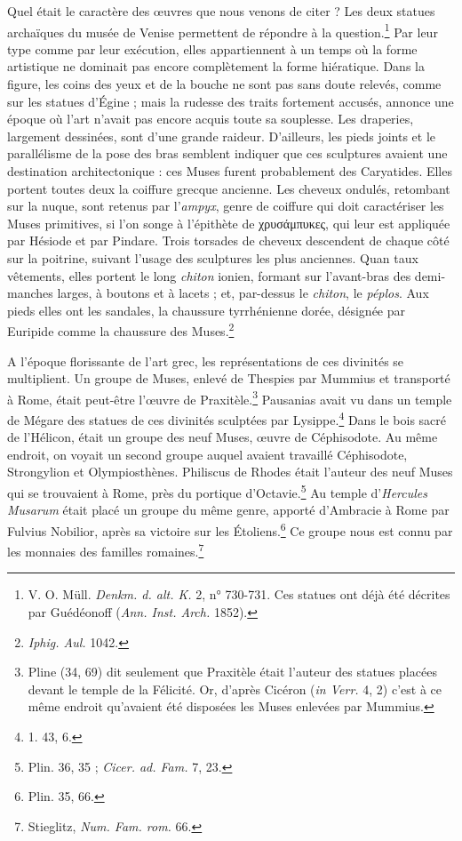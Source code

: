 \documentclass[landscape, a4paper, 11pt, oneside, polutonikogreek, french]{article}
\begin{document}
Quel était le caractère des œuvres que nous venons de citer ? Les deux statues archaïques du musée de Venise permettent de répondre à la question.\footnote{V. O. Müll. \emph{Denkm. d. alt. K.} 2, n° 730-731. Ces statues ont déjà été décrites par Guédéonoff (\emph{Ann. Inst. Arch.} 1852).} Par leur type comme par leur exécution, elles appartiennent à un temps où la forme artistique ne dominait pas encore complètement la forme hiératique. Dans la figure, les coins des yeux et de la bouche ne sont pas sans doute relevés, comme sur les statues d'Égine ; mais la rudesse des traits fortement accusés, annonce une époque où l'art n'avait pas encore acquis toute sa souplesse. Les draperies, largement dessinées, sont d'une grande raideur. D'ailleurs, les pieds joints et le parallélisme de la pose des bras semblent indiquer que ces sculptures avaient une destination architectonique : ces Muses furent probablement des Caryatides. Elles portent toutes deux la coiffure grecque ancienne. Les cheveux ondulés, retombant sur la nuque, sont retenus par l'\emph{ampyx}, genre de coiffure qui doit caractériser les Muses primitives, si l'on songe à l'épithète de χρυσάμπυκες, qui leur est appliquée par Hésiode et par Pindare. Trois torsades de cheveux descendent de chaque côté sur la poitrine, suivant l'usage des sculptures les plus anciennes. Quan taux vêtements, elles portent le long \emph{chiton} ionien, formant sur l'avant-bras des demi-manches larges, à boutons et à lacets ; et, par-dessus le \emph{chiton}, le \emph{péplos}. Aux pieds elles ont les sandales, la chaussure tyrrhénienne dorée, désignée par Euripide comme la chaussure des Muses.\footnote{\emph{Iphig. Aul.} 1042.}

A l'époque florissante de l'art grec, les représentations de ces divinités se multiplient. Un groupe de Muses, enlevé de Thespies par Mummius et transporté à Rome, était peut-être l'œuvre de Praxitèle.\footnote{Pline (34, 69) dit seulement que Praxitèle était l'auteur des statues placées devant le temple de la Félicité. Or, d'après Cicéron (\emph{in Verr.} 4, 2) c'est à ce même endroit qu'avaient été disposées les Muses enlevées par Mummius.} Pausanias avait vu dans un temple de Mégare des statues de ces divinités sculptées par Lysippe.\footnote{1. 43, 6.} Dans le bois sacré de l'Hélicon, était un groupe des neuf Muses, œuvre de Céphisodote. Au même endroit, on voyait un second groupe auquel avaient travaillé Céphisodote, Strongylion et Olympiosthènes. Philiscus de Rhodes était l'auteur des neuf Muses qui se trouvaient à Rome, près du portique d'Octavie.\footnote{Plin. 36, 35 ; \emph{Cicer. ad. Fam.} 7, 23.} Au temple d'\emph{Hercules Musarum} était placé un groupe du même genre, apporté d'Ambracie à Rome par Fulvius Nobilior, après sa victoire sur les Étoliens.\footnote{Plin. 35, 66.} Ce groupe nous est connu par les monnaies des familles romaines.\footnote{Stieglitz, \emph{Num. Fam. rom.} 66.}
\end{document}
